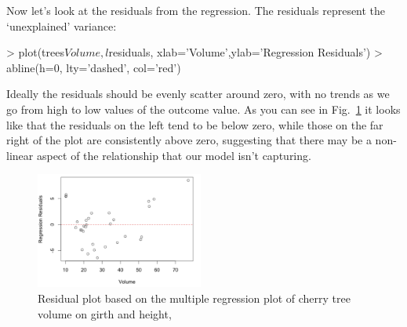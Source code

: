 Now let's look at the residuals from the regression. The residuals represent the `unexplained' variance:
\begin{R}
> plot(trees$Volume,l$residuals, xlab='Volume',ylab='Regression Residuals')
> abline(h=0, lty='dashed', col='red')
\end{R}
%
Ideally the residuals should be evenly scatter around zero, with no trends as we go from high to low values of the outcome value.  As you can see in Fig.~\ref{fig:trees-resid} it looks like that the residuals on the left tend to be below zero, while those on the far right of the plot are consistently above zero, suggesting that there may be a non-linear aspect of the relationship that our model isn't capturing.
%
\begin{figure}[htbp]
\centering
\includegraphics[height=1.5in]{./figures/hands-on4/trees-residuals.pdf}
\caption{Residual plot based on the multiple regression plot of cherry tree volume on girth and height,\label{fig:trees-resid}}
\end{figure}

